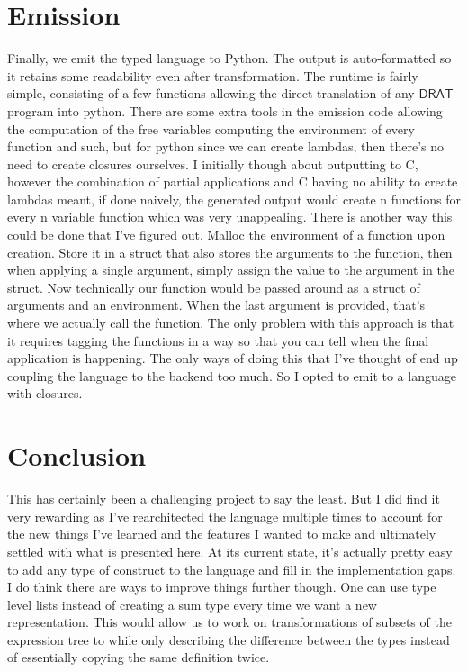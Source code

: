 \documentclass{article} %
\newcommand{\DRAT}{\mathsf{DRAT}}
\begin{document}
\section {Emission}
    Finally, we emit the typed language to Python. The output is auto-formatted so it retains some readability even after transformation. The runtime is fairly simple, consisting of a few functions allowing the direct translation of any $\DRAT$ program into python. There are some extra tools in the emission code allowing the computation of the free variables computing the environment of every function and such, but for python since we can create lambdas, then there's no need to create closures ourselves. I initially though about outputting to C, however the combination of partial applications and C having no ability to create lambdas meant, if done naively, the generated output would create n functions for every n variable function which was very unappealing. There is another way this could be done that I've figured out. Malloc the environment of a function upon creation. Store it in a struct that also stores the arguments to the function, then when applying a single argument, simply assign the value to the argument in the struct. Now technically our function would be passed around as a struct of arguments and an environment. When the last argument is provided, that's where we actually call the function. The only problem with this approach is that it requires tagging the functions in a way so that you can tell when the final application is happening. The only ways of doing this that I've thought of end up coupling the language to the backend too much. So I opted to emit to a language with closures.
\section {Conclusion}
    This has certainly been a challenging project to say the least. But I did find it very rewarding as I've rearchitected the language multiple times to account for the new things I've learned and the features I wanted to make and ultimately settled with what is presented here. At its current state, it's actually pretty easy to add any type of construct to the language and fill in the implementation gaps. I do think there are ways to improve things further though. One can use type level lists instead of creating a sum type every time we want a new representation. This would allow us to work on transformations of subsets of the expression tree to while only describing the difference between the types instead of essentially copying the same definition twice. 


\end{document}
